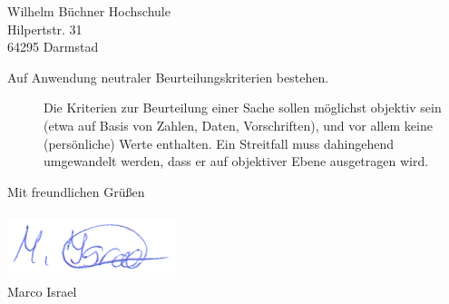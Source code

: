 \documentclass[
    version=last,           %
    DIV=13,                 %
    BCOR=0mm,               %
    paper=a4,               %
    fontsize=12pt,          %
    firsthead=on,           %
    firstfoot=on,           %
    pagenumber=on,i         %
    parskip=half,           %
    enlargefirstpage=,      %
    firsthead=on,           %
    fromrule=afteraddress,  %
    priority=off,           %
    backaddress=true,       %
    refline=dateright,      %
	fromalign=right,	    %
    fromemail=on,i          %
    fromurl=on,             %
    frombank=on,
    fromphone=on,           %
    frommobilephone=on      %
    fromlogo=on,            %
    addrfield=on,           %
    subject=untitled,  %
    foldmarks=off,          %
    numericaldate=off,      %
	pagenumber=right,	        %
	parskip=half,	        %
    headsep=false,          %
    footsepline=true,       %
    foldmarks=off,		    %
	]{scrlttr2}
\begin{document}
\begin{letter} {Wilhelm Büchner Hochschule \\
Hilpertstr. 31\\
64295 Darmstad}
\begin{itemize}
\begin{enumerate}
\begin{description}
                \item [Auf Anwendung neutraler Beurteilungskriterien bestehen.]
                    Die Kriterien zur Beurteilung einer Sache sollen möglichst
                    objektiv sein (etwa auf Basis von Zahlen, Daten,
                    Vorschriften), und vor allem keine (persönliche) Werte
                    enthalten. Ein Streitfall muss dahingehend umgewandelt werden,
                    dass er auf objektiver Ebene ausgetragen wird.
                \end{description}
        \end{enumerate}
\end{itemize}
\vspace{1cm}
Mit freundlichen Grüßen \\
\\
    \includegraphics[scale=0.70]{../unterschrift.png}
    \\
    Marco Israel




%





\end{letter}
\end{document}
